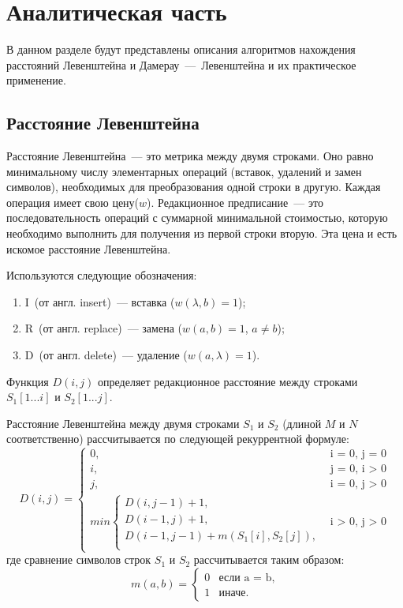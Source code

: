\chapter{Аналитическая часть}

В данном разделе будут представлены описания алгоритмов нахождения расстояний Левенштейна и Дамерау~---~Левенштейна и их практическое применение.

\section{Расстояние Левенштейна}

Расстояние Левенштейна~--- это метрика между двумя строками. Оно равно минимальному числу элементарных операций (вставок, удалений и замен символов), необходимых для преобразования одной строки в другую\cite{lev-damlev-analysis}.
Каждая операция имеет свою цену($w$). Редакционное предписание~--- это последовательность операций с суммарной минимальной стоимостью, которую необходимо выполнить для получения из первой строки вторую. Эта цена и есть искомое расстояние Левенштейна.

Используются следующие обозначения:
\begin{enumerate}
    \item I~(от англ. insert)~--- вставка ($w(\lambda, b) = 1$);
    \item R~(от англ. replace)~--- замена ($w(a, b) = 1$, $a \neq b$);
    \item D~(от англ. delete)~--- удаление ($w(a, \lambda) = 1$).
\end{enumerate}

Функция $D(i, j)$ определяет редакционное расстояние между строками $S_1[1...i]$ и $S_2[1...j]$.

Расстояние Левенштейна между двумя строками $S_{1}$ и $S_{2}$ (длиной $M$ и $N$ соответственно) рассчитывается по следующей рекуррентной формуле:
\begin{equation}
	\label{eq:L}
	D(i, j) =
	\begin{cases}
		0, &\text{i = 0, j = 0}\\
		i, &\text{j = 0, i > 0}\\
		j, &\text{i = 0, j > 0}\\
		min \begin{cases}
			D(i, j - 1) + 1,\\
			D(i - 1, j) + 1,\\
			D(i - 1, j - 1) +  m(S_{1}[i], S_{2}[j]), \\
		\end{cases}
		&\text{i > 0, j > 0}
	\end{cases}
\end{equation}
где сравнение символов строк $S_1$ и $S_2$ рассчитывается таким образом:
\begin{equation}
	\label{eq:m}
	m(a, b) = \begin{cases}
		0 &\text{если a = b,}\\
		1 &\text{иначе.}
	\end{cases}
\end{equation}

